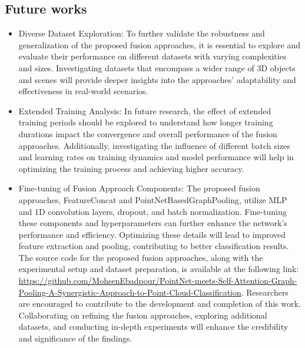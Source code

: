 \documentclass[conference]{IEEEtran}
\begin{document}
\subsection{Future works}
\begin{itemize}
\item 	Diverse Dataset Exploration: To further validate the robustness and generalization of the proposed fusion approaches, it is essential to explore and evaluate their performance on different datasets with varying complexities and sizes. Investigating datasets that encompass a wider range of 3D objects and scenes will provide deeper insights into the approaches' adaptability and effectiveness in real-world scenarios.

\item 	Extended Training Analysis: In future research, the effect of extended training periods should be explored to understand how longer training durations impact the convergence and overall performance of the fusion approaches. Additionally, investigating the influence of different batch sizes and learning rates on training dynamics and model performance will help in optimizing the training process and achieving higher accuracy.


\item 	Fine-tuning of Fusion Approach Components: The proposed fusion approaches, FeatureConcat and PointNetBasedGraphPooling, utilize MLP and 1D convolution layers, dropout, and batch normalization. Fine-tuning these components and hyperparameters can further enhance the network's performance and efficiency. Optimizing these details will lead to improved feature extraction and pooling, contributing to better classification results.
The source code for the proposed fusion approaches, along with the experimental setup and dataset preparation, is available at the following link: \url{https://github.com/MohsenEbadpour/PointNet-meets-Self-Attention-Graph-Pooling-A-Synergistic-Approach-to-Point-Cloud-Classification}. Researchers are encouraged to contribute to the development and completion of this work. Collaborating on refining the fusion approaches, exploring additional datasets, and conducting in-depth experiments will enhance the credibility and significance of the findings.

\end{itemize}







\end{document}
